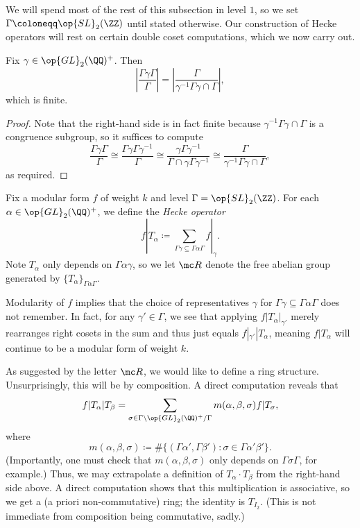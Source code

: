 \documentclass{article}
\begin{document}
We will spend most of the rest of this subsection in level $1$, so we set $\Gamma\coloneqq\op{SL}_2(\ZZ)$ until stated otherwise. Our construction of Hecke operators will rest on certain double coset computations, which we now carry out.
\begin{lemma} \label{lem:double-coset-quotient}
	Fix $\gamma\in\op{GL}_2(\QQ)^+$. Then
	\[\left|\frac{\Gamma\gamma\Gamma}{\Gamma}\right|=\left|\frac{\Gamma}{\gamma^{-1}\Gamma\gamma\cap\Gamma}\right|,\]
	which is finite.
\end{lemma}
\begin{proof}
	Note that the right-hand side is in fact finite because $\gamma^{-1}\Gamma\gamma\cap\Gamma$ is a congruence subgroup, so it suffices to compute
	\[\frac{\Gamma\gamma\Gamma}{\Gamma}\cong\frac{\Gamma\gamma\Gamma\gamma^{-1}}{\Gamma}\cong\frac{\gamma\Gamma\gamma^{-1}}{\Gamma\cap\gamma\Gamma\gamma^{-1}}\cong\frac{\Gamma}{\gamma^{-1}\Gamma\gamma\cap\Gamma},\]
	as required.
\end{proof}
\begin{definition}
	Fix a modular form $f$ of weight $k$ and level $\Gamma=\op{SL}_2(\ZZ)$. For each $\alpha\in\op{GL}_2(\QQ)^+$, we define the \textit{Hecke operator}
	\[f|T_\alpha\coloneqq\sum_{\Gamma\gamma\subseteq\Gamma\alpha\Gamma}f|_\gamma.\]
	Note $T_\alpha$ only depends on $\Gamma\alpha\gamma$, so we let $\mc R$ denote the free abelian group generated by $\{T_\alpha\}_{\Gamma\alpha\Gamma}$.
\end{definition}
Modularity of $f$ implies that the choice of representatives $\gamma$ for $\Gamma\gamma\subseteq\Gamma\alpha\Gamma$ does not remember. In fact, for any $\gamma'\in\Gamma$, we see that applying $f|T_\alpha|_{\gamma'}$ merely rearranges right cosets in the sum and thus just equals $f|_{\gamma'}|T_\alpha$, meaning $f|T_\alpha$ will continue to be a modular form of weight $k$.

As suggested by the letter $\mc R$, we would like to define a ring structure. Unsurprisingly, this will be by composition. A direct computation reveals that
\[f|T_\alpha|T_\beta=\sum_{\sigma\in\Gamma\backslash\op{GL}_2(\QQ)^+/\Gamma}m(\alpha,\beta,\sigma)f|T_\sigma,\]
where
\[m(\alpha,\beta,\sigma)\coloneqq\#\{(\Gamma\alpha',\Gamma\beta'):\sigma\in\Gamma\alpha'\beta'\}.\]
(Importantly, one must check that $m(\alpha,\beta,\sigma)$ only depends on $\Gamma\sigma\Gamma$, for example.) Thus, we may extrapolate a definition of $T_\alpha\cdot T_\beta$ from the right-hand side above. A direct computation shows that this multiplication is associative, so we get a (a priori non-commutative) ring; the identity is $T_{I_2}$. (This is not immediate from composition being commutative, sadly.)
\end{document}

